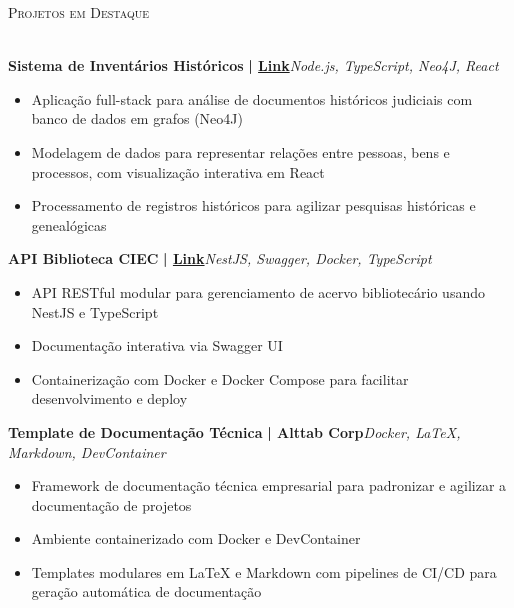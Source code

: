 \documentclass[a4paper]{article}
\newcommand{\lineunder}{
    \vspace*{-8pt} \\
    \hspace*{-18pt} \hrulefill \\
}
\newcommand{\header}[1]{
    {\hspace*{-18pt}\vspace*{6pt} \textsc{#1}}
    \vspace*{-6pt} \lineunder
}
\begin{document}
%
%
\header{Projetos em Destaque}
\vspace{1mm}

{\textbf{Sistema de Inventários Históricos}}\textbf{ | \href{https://repositorio.ifpb.edu.br/handle/177683/2898}{Link}}\hfill{\sl Node.js, TypeScript, Neo4J, React}\\
\vspace{-3mm}
\begin{itemize}[leftmargin=*] \itemsep -2pt
    \item Aplicação full-stack para análise de documentos históricos judiciais com banco de dados em grafos (Neo4J)
    \item Modelagem de dados para representar relações entre pessoas, bens e processos, com visualização interativa em React
    \item Processamento de registros históricos para agilizar pesquisas históricas e genealógicas
\end{itemize}
\vspace*{2mm}

{\textbf{API Biblioteca CIEC}}\textbf{ | \href{https://github.com/Alttabcorp/API-bibliteca_siec}{Link}}\hfill{\sl NestJS, Swagger, Docker, TypeScript}\\
\vspace{-3mm}
\begin{itemize}[leftmargin=*] \itemsep -2pt
    \item API RESTful modular para gerenciamento de acervo bibliotecário usando NestJS e TypeScript
    \item Documentação interativa via Swagger UI
    \item Containerização com Docker e Docker Compose para facilitar desenvolvimento e deploy
\end{itemize}
\vspace*{2mm}

{\textbf{Template de Documentação Técnica}}\textbf{ | Alttab Corp}\hfill{\sl Docker, LaTeX, Markdown, DevContainer}\\
\vspace{-3mm}
\begin{itemize}[leftmargin=*] \itemsep -2pt
    \item Framework de documentação técnica empresarial para padronizar e agilizar a documentação de projetos
    \item Ambiente containerizado com Docker e DevContainer
    \item Templates modulares em LaTeX e Markdown com pipelines de CI/CD para geração automática de documentação
\end{itemize}
\vspace*{2mm}
\end{document}
